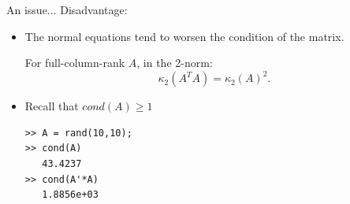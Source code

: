\documentclass[10pt]{beamer}
\begin{document}
\begin{frame}[fragile]{An issue...}
Disadvantage:

\begin{itemize}
    \item  The normal equations tend to worsen the condition of the matrix. 

\begin{theorem}
For full-column-rank $A$, in the 2-norm:
$$\kappa_2(A^TA)=\kappa_2(A)^2.$$
\end{theorem}
\item Recall that $cond(A)\ge1$ 

\begin{lstlisting}
>> A = rand(10,10);
>> cond(A)
   43.4237
>> cond(A'*A)
   1.8856e+03
\end{lstlisting}

\end{itemize}


\end{frame}
    
\end{document}
